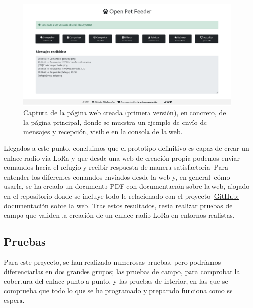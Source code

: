\documentclass[12pt]{article}
\begin{document}
	\begin{figure}[h!]
		\begin{center}
			\includegraphics[width=1\textwidth]{img/captura_web_2.png}
			\caption{Captura de la página web creada (primera versión), en concreto, de la página principal, donde se muestra un ejemplo de envío de mensajes y recepción, visible en la consola de la web.}
			\label{Web: captura ejemplo consola}
		\end{center}
	\end{figure}

	\noindent Llegados a este punto, concluimos que el prototipo definitivo es capaz de crear un enlace radio vía LoRa y que desde una web de creación propia podemos enviar comandos hacia el refugio y recibir respuesta de manera satisfactoria. Para entender los diferentes comandos enviados desde la web y, en general, cómo usarla, se ha creado un documento PDF con documentación sobre la web, alojado en el repositorio donde se incluye todo lo relacionado con el proyecto: \href{https://github.com/ChiaFranfer/open-pet-feeder/tree/master/memoria/complementarios}{GitHub: documentación sobre la web}. Tras estos resultados, resta realizar pruebas de campo que validen la creación de un enlace radio LoRa en entornos realistas.\\
	
	\pagebreak
	
	\subsection[Pruebas]{Pruebas}
	
	\noindent Para este proyecto, se han realizado numerosas pruebas, pero podríamos diferenciarlas en dos grandes grupos; las pruebas de campo, para comprobar la cobertura del enlace punto a punto, y las pruebas de interior, en las que se comprueba que todo lo que se ha programado y preparado funciona como se espera. \\
	
\end{document}
